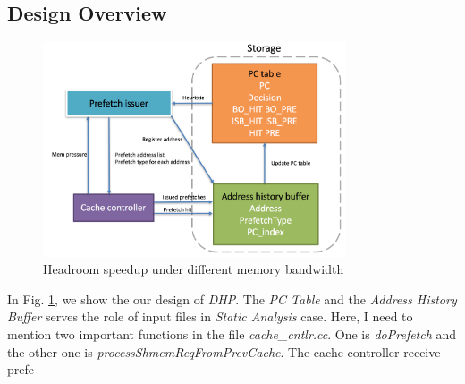   \subsection{Design Overview}
  \label{sec:dynamicdesignoverview}
  \begin{figure}[ht!]
	   \centering
	   \includegraphics[width=0.8\textwidth]{images/dynamic_design.png}
	   \caption{Headroom speedup under different memory bandwidth}
	   \label{fig:dynamic_design}
  \end{figure}

  In Fig. \ref{fig:dynamic_design}, we show the our design of \emph{DHP}. The \emph{PC Table} and the \emph{Address History Buffer} serves the role of input files in \emph{Static Analysis} case. Here, I need to mention two important functions in the file \emph{cache\_cntlr.cc}. One is \emph{doPrefetch} and the other one is \emph{processShmemReqFromPrevCache}. The cache controller receive prefe 
